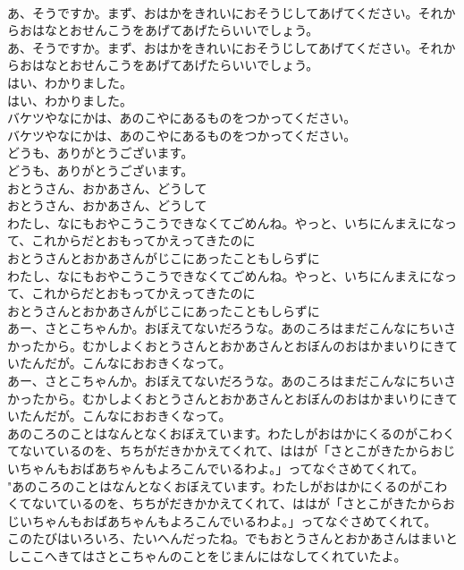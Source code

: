 \documentclass[8pt]{extreport}
\begin{document}
\begin{CJK}{UTF8}{min}
\\	あ、そうですか。まず、おはかをきれいにおそうじしてあげてください。それからおはなとおせんこうをあげてあげたらいいでしょう。	
\\	あ、そうですか。まず、おはかをきれいにおそうじしてあげてください。それからおはなとおせんこうをあげてあげたらいいでしょう。 
\\	はい、わかりました。	
\\	はい、わかりました。 
\\	バケツやなにかは、あのこやにあるものをつかってください。	
\\	バケツやなにかは、あのこやにあるものをつかってください。 
\\	どうも、ありがとうございます。	
\\	どうも、ありがとうございます。 
\\	おとうさん、おかあさん、どうして
\\	おとうさん、おかあさん、どうして
\\	わたし、なにもおやこうこうできなくてごめんね。やっと、いちにんまえになって、これからだとおもってかえってきたのに
\\	おとうさんとおかあさんがじこにあったこともしらずに
\\	わたし、なにもおやこうこうできなくてごめんね。やっと、いちにんまえになって、これからだとおもってかえってきたのに
\\	おとうさんとおかあさんがじこにあったこともしらずに
\\	あー、さとこちゃんか。おぼえてないだろうな。あのころはまだこんなにちいさかったから。むかしよくおとうさんとおかあさんとおぼんのおはかまいりにきていたんだが。こんなにおおきくなって。	
\\	あー、さとこちゃんか。おぼえてないだろうな。あのころはまだこんなにちいさかったから。むかしよくおとうさんとおかあさんとおぼんのおはかまいりにきていたんだが。こんなにおおきくなって。 
\\	あのころのことはなんとなくおぼえています。わたしがおはかにくるのがこわくてないているのを、ちちがだきかかえてくれて、ははが「さとこがきたからおじいちゃんもおばあちゃんもよろこんでいるわよ。」ってなぐさめてくれて。	
\\	"あのころのことはなんとなくおぼえています。わたしがおはかにくるのがこわくてないているのを、ちちがだきかかえてくれて、ははが「さとこがきたからおじいちゃんもおばあちゃんもよろこんでいるわよ。」ってなぐさめてくれて。 
\\	このたびはいろいろ、たいへんだったね。でもおとうさんとおかあさんはまいとしここへきてはさとこちゃんのことをじまんにはなしてくれていたよ。	

\end{CJK}
\end{document}

